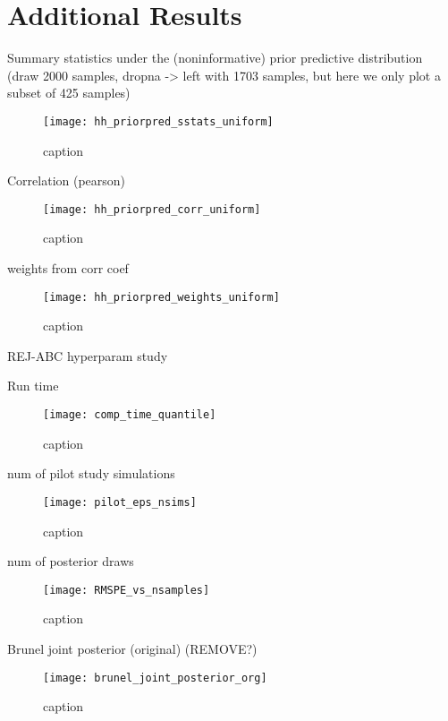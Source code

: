 \chapter{Additional Results}\label{sec:Appendix A}


Summary statistics under the (noninformative) prior predictive distribution (draw 2000 samples, dropna -> left with 1703 samples, but here we only plot a subset of 425 samples)

\begin{figure}[H]
    \centering
    \texttt{[image: hh\_priorpred\_sstats\_uniform]}
    \caption{caption}
    \label{fig:fig1}
\end{figure} 


Correlation (pearson) 

\begin{figure}[H]
    \centering
    \texttt{[image: hh\_priorpred\_corr\_uniform]}
    \caption{caption}
    \label{fig:fig1}
\end{figure} 

weights from corr coef

\begin{figure}[H]
    \centering
    \texttt{[image: hh\_priorpred\_weights\_uniform]}
    \caption{caption}
    \label{fig:fig1}
\end{figure} 

 
REJ-ABC hyperparam study 

Run time

\begin{figure}[H]
    \centering
    \texttt{[image: comp\_time\_quantile]}
    \caption{caption}
    \label{fig:fig1}
\end{figure}

num of pilot study simulations 

\begin{figure}[H]
    \centering
    \texttt{[image: pilot\_eps\_nsims]}
    \caption{caption}
    \label{fig:fig1}
\end{figure} 

num of posterior draws

\begin{figure}[H]
    \centering
    \texttt{[image: RMSPE\_vs\_nsamples]}
    \caption{caption}
    \label{fig:fig1}
\end{figure} 


Brunel joint posterior (original) (REMOVE?)

\begin{figure}[H]
    \centering
    \texttt{[image: brunel\_joint\_posterior\_org]}
    \caption{caption}
    \label{fig:fig1}
\end{figure} 



